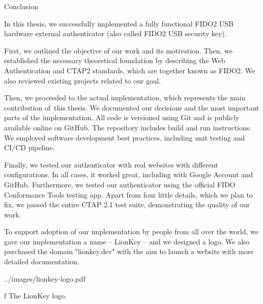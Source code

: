 \chap[conclusion] Conclusion

In this thesis, {\sbf we successfully implemented} a fully functional FIDO2 USB hardware external authenticator (also called FIDO2 USB security key).

First, we outlined the objective of our work and its motivation. Then, we established the necessary theoretical foundation by describing the Web Authentication and CTAP2 standards, which are together known as FIDO2. We also reviewed existing projects related to our goal.

Then, we proceeded to the actual implementation, which represents the main contribution of~this thesis. We documented our decisions and the most important parts of the implementation. All code is versioned using Git and is publicly {\sbf available online on GitHub}. The repository includes build and run instructions. We employed software development best practices, including unit testing and CI/CD pipeline.

Finally, {\sbf we tested} our authenticator {\sbf with real websites} with different configurations. In all cases, {\sbf it worked great}, including with Google Account and GitHub.
Furthermore, we tested our authenticator using the official FIDO Conformance Tools testing app. Apart from four little details, which we plan to fix, we passed the entire CTAP 2.1 test suite, demonstrating the quality of our work.

To support adoption of our implementation by people from all over the world, we gave our implementation a name – LionKey – and we designed a logo. We also purchased the domain "lionkey.dev" with the aim to launch a website with more detailed documentation.

\midinsert
\picheight=45mm \cinspic ../images/lionkey-logo.pdf
\caption/f The LionKey logo.
\endinsert
